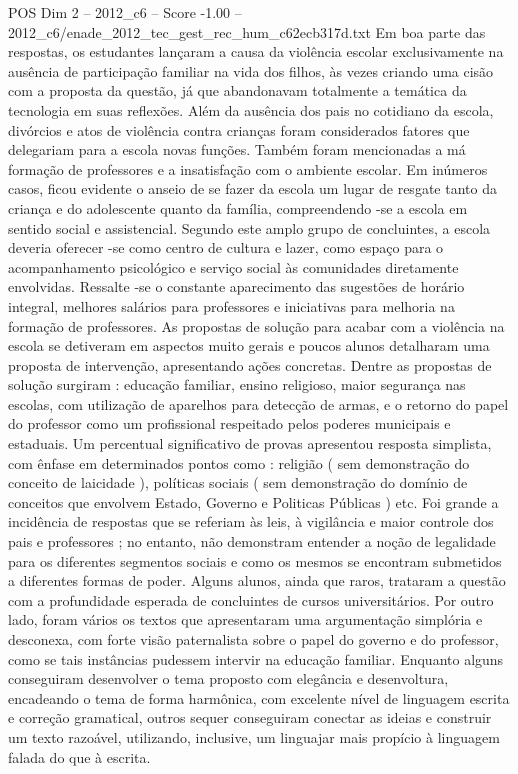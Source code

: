 \begin{textsample}{POS Dim 2 – 2012\_c6 – Score -1.00 – 2012\_c6/enade\_2012\_tec\_gest\_rec\_hum\_c62ecb317d.txt}
Em boa parte das respostas, os estudantes lançaram a causa da violência escolar exclusivamente na ausência de participação familiar na vida dos filhos, às vezes criando uma cisão com a proposta da questão, já que abandonavam totalmente a temática da tecnologia em suas reflexões.
Além da ausência dos pais no cotidiano da escola, divórcios e atos de violência contra crianças foram considerados fatores que delegariam para a escola novas funções.
Também foram mencionadas a má formação de professores e a insatisfação com o ambiente escolar.
Em inúmeros casos, ficou evidente o anseio de se fazer da escola um lugar de resgate tanto da criança e do adolescente quanto da família, compreendendo -se a escola em sentido social e assistencial.
Segundo este amplo grupo de concluintes, a escola deveria oferecer -se como centro de cultura e lazer, como espaço para o acompanhamento psicológico e serviço social às comunidades diretamente envolvidas.
Ressalte -se o constante aparecimento das sugestões de horário integral, melhores salários para professores e iniciativas para melhoria na formação de professores.
As propostas de solução para acabar com a violência na escola se detiveram em aspectos muito gerais e poucos alunos detalharam uma proposta de intervenção, apresentando ações concretas.
Dentre as propostas de solução surgiram : educação familiar, ensino religioso, maior segurança nas escolas, com utilização de aparelhos para detecção de armas, e o retorno do papel do professor como um profissional respeitado pelos poderes municipais e estaduais.
Um percentual significativo de provas apresentou resposta simplista, com ênfase em determinados pontos como : religião ( sem demonstração do conceito de laicidade ), políticas sociais ( sem demonstração do domínio de conceitos que envolvem Estado, Governo e Politicas Públicas ) etc.
Foi grande a incidência de respostas que se referiam às leis, à vigilância e maior controle dos pais e professores ; no entanto, não demonstram entender a noção de legalidade para os diferentes segmentos sociais e como os mesmos se encontram submetidos a diferentes formas de poder.
Alguns alunos, ainda que raros, trataram a questão com a profundidade esperada de concluintes de cursos universitários.
Por outro lado, foram vários os textos que apresentaram uma argumentação simplória e desconexa, com forte visão paternalista sobre o papel do governo e do professor, como se tais instâncias pudessem intervir na educação familiar.
Enquanto alguns conseguiram desenvolver o tema proposto com elegância e desenvoltura, encadeando o tema de forma harmônica, com excelente nível de linguagem escrita e correção gramatical, outros sequer conseguiram conectar as ideias e construir um texto razoável, utilizando, inclusive, um linguajar mais propício à linguagem falada do que à escrita.

\end{textsample}
